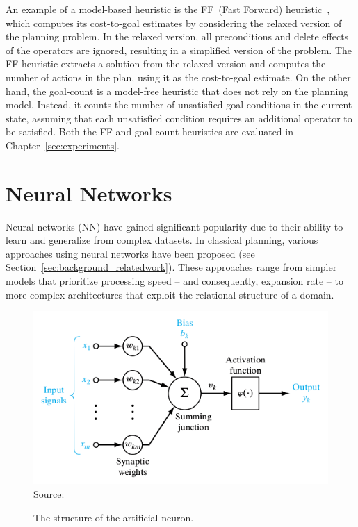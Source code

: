 An example of a model-based heuristic is the FF~(Fast Forward) heuristic~\cite{Hoffmann.Nebel/2001}, which computes its cost-to-goal estimates by considering the relaxed version of the planning problem. In the relaxed version, all preconditions and delete effects of the operators are ignored, resulting in a simplified version of the problem. The FF heuristic extracts a solution from the relaxed version and computes the number of actions in the plan, using it as the cost-to-goal estimate. On the other hand, the goal-count is a model-free heuristic that does not rely on the planning model. Instead, it counts the number of unsatisfied goal conditions in the current state, assuming that each unsatisfied condition requires an additional operator to be satisfied. Both the FF and goal-count heuristics are evaluated in Chapter~\ref{sec:experiments}.

\section{Neural Networks}
\label{sec:background_neuralnetworks}

Neural networks (NN) have gained significant popularity due to their ability to learn and generalize from complex datasets. In classical planning, various approaches using neural networks have been proposed (see Section~\ref{sec:background_relatedwork}). These approaches range from simpler models that prioritize processing speed -- and consequently, expansion rate -- to more complex architectures that exploit the relational structure of a domain.

\begin{figure}[ht]
    \caption{The structure of the artificial neuron.}
    \label{fig:neuron}
    \centering
    \includegraphics[width=0.9\linewidth]{figures/neuron.png} \\
    Source:~\cite{Haykin/2009}
\end{figure}

